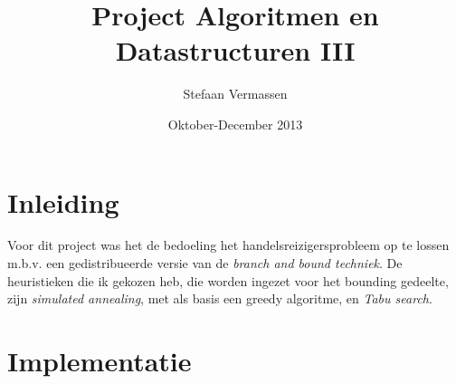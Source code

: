 \documentclass[12pt]{article}
\begin{document}
\title{\vspace{-1.2in}Project Algoritmen en Datastructuren III}
\author{Stefaan Vermassen}
\date{Oktober-December 2013}
\maketitle
\section{Inleiding}
Voor dit project was het de bedoeling het handelsreizigersprobleem op te lossen m.b.v. een gedistribueerde versie van de \textit{branch and bound techniek}. De heuristieken die ik gekozen heb, die worden ingezet voor het bounding gedeelte, zijn \textit{simulated annealing}, met als basis een greedy algoritme, en \textit{Tabu search}.
\section{Implementatie}
\end{document}
